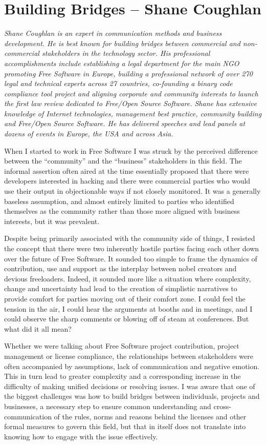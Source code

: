 \chapter{Building Bridges -- Shane Coughlan}

\textit{Shane Coughlan is an expert in communication methods and business development. He is best known for building bridges between commercial and non-commercial stakeholders in the technology sector. His professional accomplishments include establishing a legal department for the main NGO promoting Free Software in Europe, building a professional network of over 270 legal and technical experts across 27 countries, co-founding a binary code compliance tool project and aligning corporate and community interests to launch the first law review dedicated to Free/Open Source Software. Shane has extensive knowledge of Internet technologies, management best practice, community building and Free/Open Source Software. He has delivered speeches and lead panels at dozens of events in Europe, the USA and across Asia.}

When I started to work in Free Software I was struck by the perceived difference between the ``community'' and the ``business'' stakeholders in this field. The informal assertion often aired at the time essentially proposed that there were developers interested in hacking and there were commercial parties who would use their output in objectionable ways if not closely monitored. It was a generally baseless assumption, and almost entirely limited to parties who identified themselves as the community rather than those more aligned with business interests, but it was prevalent.

Despite being primarily associated with the community side of things, I resisted the concept that there were two inherently hostile parties facing each other down over the future of Free Software. It sounded too simple to frame the dynamics of contribution, use and support as the interplay between nobel creators and devious freeloaders. Indeed, it sounded more like a situation where complexity, change and uncertainty had lead to the creation of simplistic narratives to provide comfort for parties moving out of their comfort zone. I could feel the tension in the air, I could hear the arguments at booths and in meetings, and I could observe the sharp comments or blowing off of steam at conferences. But what did it all mean?

Whether we were talking about Free Software project contribution, project management or license compliance, the relationships between stakeholders were often accompanied by assumptions, lack of communication and negative emotion. This in turn lead to greater complexity and a corresponding increase in the difficulty of making unified decisions or resolving issues. I was aware that one of the biggest challenges was how to build bridges between individuals, projects and businesses, a necessary step to ensure common understanding and cross-communication of the rules, norms and reasons behind the licenses and other formal measures to govern this field, but that in itself does not translate into knowing how to engage with the issue effectively.

